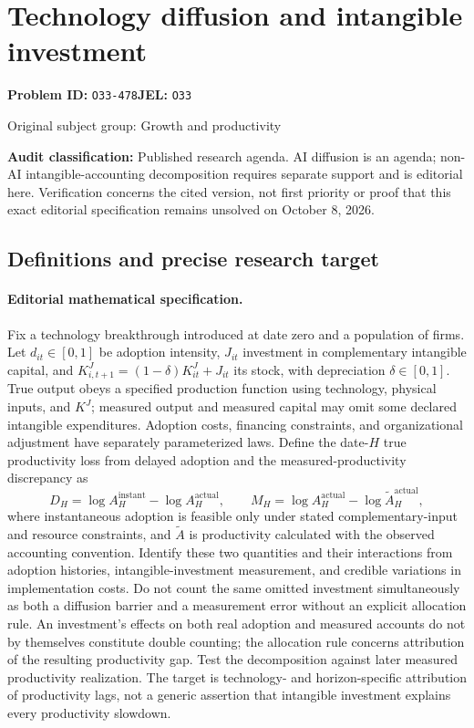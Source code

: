\documentclass[11pt,a4paper]{article}
\begin{document}
\section*{Technology diffusion and intangible investment}
\textbf{Problem ID:} \texttt{O33-478}\quad \textbf{JEL:} \texttt{O33}\par
\label{problem:OP-0264}
{\sffamily\small\color{muted}Original subject group: Growth and productivity\par}
\label{definitions:problem:30007545}
\textbf{Audit classification:} Published research agenda. AI diffusion is an agenda; non-AI intangible-accounting decomposition requires separate support and is editorial here. Verification concerns the cited version, not first priority or proof that this exact editorial specification remains unsolved on October 8, 2026.
\subsection*{Definitions and precise research target}
\paragraph{Editorial mathematical specification.} Fix a technology breakthrough introduced at date zero and a population of firms. Let \(d_{it}\in[0,1]\) be adoption intensity, \(J_{it}\) investment in complementary intangible capital, and \(K^J_{i,t+1}=(1-\delta)K^J_{it}+J_{it}\) its stock, with depreciation \(\delta\in[0,1]\). True output obeys a specified production function using technology, physical inputs, and \(K^J\); measured output and measured capital may omit some declared intangible expenditures. Adoption costs, financing constraints, and organizational adjustment have separately parameterized laws.
Define the date-\(H\) true productivity loss from delayed adoption and the measured-productivity discrepancy as
\[
D_H=\log A_H^{\mathrm{instant}}-\log A_H^{\mathrm{actual}},\qquad
M_H=\log A_H^{\mathrm{actual}}-\log \widetilde A_H^{\mathrm{actual}},
\]
where instantaneous adoption is feasible only under stated complementary-input and resource constraints, and \(\widetilde A\) is productivity calculated with the observed accounting convention. Identify these two quantities and their interactions from adoption histories, intangible-investment measurement, and credible variations in implementation costs. Do not count the same omitted investment simultaneously as both a diffusion barrier and a measurement error without an explicit allocation rule. An investment's effects on both real adoption and measured accounts do not by themselves constitute double counting; the allocation rule concerns attribution of the resulting productivity gap. Test the decomposition against later measured productivity realization. The target is technology- and horizon-specific attribution of productivity lags, not a generic assertion that intangible investment explains every productivity slowdown.
\end{document}
